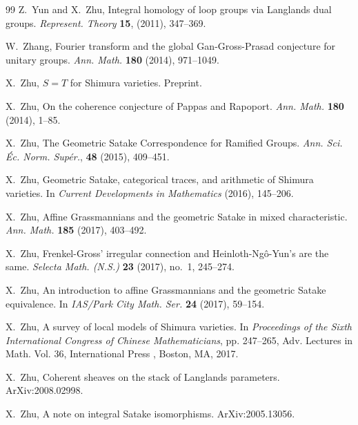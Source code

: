 \documentclass[11pt]{amsart}
\theoremstyle{definition}
\theoremstyle{definition}
\theoremstyle{definition}
\numberwithin{equation}{section}
\begin{document}
\begin{thebibliography}{99}
Z.~Yun and X.~Zhu, Integral homology of loop groups via Langlands dual groups. \emph{Represent. Theory} \textbf{15}, (2011), 347--369.

W.~Zhang, Fourier transform and the global Gan-Gross-Prasad conjecture for unitary groups. \emph{Ann. Math.} \textbf{180} (2014), 971--1049.

X.~Zhu, $S=T$ for Shimura varieties. Preprint.

X.~Zhu, On the coherence conjecture of Pappas and Rapoport. \emph{Ann. Math.} \textbf{180} (2014), 1--85.

X.~Zhu, The Geometric Satake Correspondence for Ramified Groups. \emph{Ann. Sci. \'Ec. Norm. Sup\'er.}, \textbf{48} (2015),  409--451.

X.~Zhu, Geometric Satake, categorical traces, and arithmetic of Shimura varieties. In \emph{Current Developments in Mathematics} (2016), 145--206.

X.~Zhu, Affine Grassmannians and the geometric Satake in mixed characteristic. \emph{Ann. Math.} \textbf{185} (2017), 403--492.

X.~Zhu, Frenkel-Gross' irregular connection and Heinloth-Ng\^o-Yun's are the same. \emph{Selecta Math. (N.S.)} \textbf{23} (2017), no.~1, 245--274.

X.~Zhu, An introduction to affine Grassmannians and the geometric Satake equivalence. In \emph{IAS/Park City Math. Ser.} \textbf{24} (2017), 59--154.

X.~Zhu, A survey of local models of Shimura varieties. In \emph{Proceedings of the Sixth International Congress of Chinese Mathematicians}, pp. 247--265, Adv. Lectures in Math. Vol. 36, International Press , Boston, MA, 2017.

X.~Zhu, Coherent sheaves on the stack of Langlands parameters. ArXiv:2008.02998.

X.~Zhu, A note on integral Satake isomorphisms. ArXiv:2005.13056.



\end{thebibliography}
\end{document}
